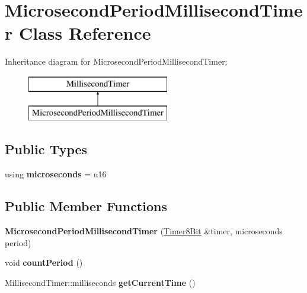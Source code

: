 \hypertarget{class_microsecond_period_millisecond_timer}{}\section{Microsecond\+Period\+Millisecond\+Timer Class Reference}
\label{class_microsecond_period_millisecond_timer}
Inheritance diagram for Microsecond\+Period\+Millisecond\+Timer\+:\begin{figure}[H]
\begin{center}
\leavevmode
\includegraphics[height=2.000000cm]{class_microsecond_period_millisecond_timer}
\end{center}
\end{figure}
\subsection*{Public Types}
\begin{DoxyCompactItemize}
\item 
\mbox{\label{class_microsecond_period_millisecond_timer_aab702172ad2a1b118d9d02b793321036}} 
using {\bfseries microseconds} = u16
\end{DoxyCompactItemize}
\subsection*{Public Member Functions}
\begin{DoxyCompactItemize}
\item 
\mbox{\label{class_microsecond_period_millisecond_timer_a9dcfd2af9a5dff8a99ef9e0da07fe5e5}} 
{\bfseries Microsecond\+Period\+Millisecond\+Timer} (\mbox{\hyperlink{class_timer8_bit}{Timer8\+Bit}} \&timer, microseconds period)
\item 
\mbox{\label{class_microsecond_period_millisecond_timer_a3eb035238a25c262afd985bd20f8155f}} 
void {\bfseries count\+Period} ()
\item 
\mbox{\label{class_microsecond_period_millisecond_timer_a7a806faaaa2a4dc5abe77940f8893887}} 
Millisecond\+Timer\+::milliseconds {\bfseries get\+Current\+Time} ()
\end{DoxyCompactItemize}


